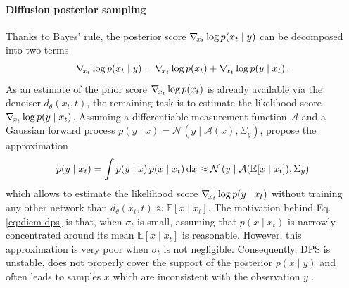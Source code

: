\paragraph{Diffusion posterior sampling} Thanks to Bayes' rule, the posterior score $\nabla_{\!{x_t}} \log p(x_t \mid y)$ can be decomposed into two terms \cite{song2021scorebased, kawar2021snips, song2022solving, chung2023diffusion, song2023pseudoinverseguided, rozet2023scorebased, finzi2023userdefined, boys2023tweedie}
\begin{equation} \label{eq:diem-score-bayes}
    \nabla_{\!{x_t}} \log p(x_t \mid y) = \nabla_{\!{x_t}} \log p(x_t) + \nabla_{\!{x_t}} \log p(y \mid x_t) \, .
\end{equation}
As an estimate of the prior score $\nabla_{\!{x_t}} \log p(x_t)$ is already available via the denoiser $d_\theta(x_t, t)$, the remaining task is to estimate the likelihood score $\nabla_{\!{x_t}} \log p(y \mid x_t)$. Assuming a differentiable measurement function $\mathcal{A}$ and a Gaussian forward process $p(y \mid x) = \mathcal{N}(y \mid \mathcal{A}(x), \Sigma_y)$, \textcite{chung2023diffusion} propose the approximation
\begin{equation} \label{eq:diem-dps}
    p(y \mid x_t) = \int p(y \mid x) \, p(x \mid x_t) \operatorname{d}\!{x} \approx \mathcal{N} \left(y \mid \mathcal{A}(\mathbb{E}[x \mid x_t]), \Sigma_y \right)
\end{equation}
which allows to estimate the likelihood score $\nabla_{\!{x_t}} \log p(y \mid x_t)$ without training any other network than $d_\theta(x_t, t) \approx \mathbb{E}[x \mid x_t]$. The motivation behind Eq. \eqref{eq:diem-dps} is that, when $\sigma_t$ is small, assuming that $p(x \mid x_t)$ is narrowly concentrated around its mean $\mathbb{E}[x \mid x_t]$ is reasonable. However, this approximation is very poor when $\sigma_t$ is not negligible. Consequently, DPS \cite{chung2023diffusion} is unstable, does not properly cover the support of the posterior $p(x \mid y)$ and often leads to samples $x$ which are inconsistent with the observation $y$ \cite{song2023pseudoinverseguided, rozet2023scorebased, finzi2023userdefined, boys2023tweedie}.

